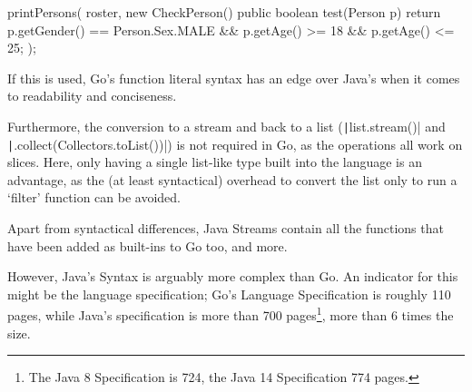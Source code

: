 \begin{javacode}
printPersons(
    roster,
    new CheckPerson() {
        public boolean test(Person p) {
            return p.getGender() == Person.Sex.MALE
                && p.getAge() >= 18
                && p.getAge() <= 25;
        }
    }
);
\end{javacode}
\autocite{java-lambda-expressions}

If this is used, Go's function literal syntax has an edge over Java's when it comes to
readability and conciseness.

Furthermore, the conversion to a stream and back to a list
(\texttt|list.stream()| and \texttt|.collect(Collectors.toList())|)
is not required in Go, as the operations all work on slices. Here, only having a single
list-like type built into the language is an advantage, as the (at least syntactical)
overhead to convert the list only to run a `filter' function can be avoided.

Apart from syntactical differences, Java Streams contain all the functions that
have been added as built-ins to Go too, and more.

However, Java's Syntax is arguably more complex than Go. An indicator for this might be
the language specification; Go's Language Specification is roughly 110 pages, while
Java's specification is more than 700 pages\footnote{
	The Java 8 Specification is 724\autocite{java-8-spec}, the Java 14
	Specification 774\autocite{java-14-spec} pages.}, more than 6 times the size.
